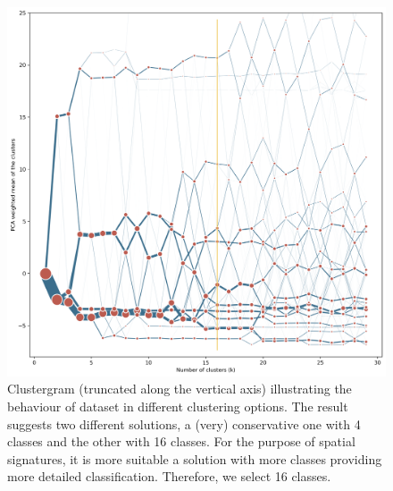 \begin{figure}
    \includegraphics[width=\linewidth]{figures/clustergram_bcn.png}
    \caption{Clustergram (truncated along the vertical axis) illustrating the behaviour
    of dataset in different clustering options. The result suggests two different solutions,
    a (very) conservative one with 4 classes and the other with 16 classes. For the purpose of
    spatial signatures, it is more suitable a solution with more classes providing more detailed
    classification. Therefore, we select 16 classes.
    }
    \label{fig:cgram_bcn}
\end{figure}

